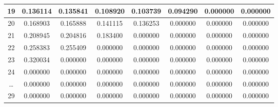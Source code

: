 \documentclass{article}
\begin{document}
\begin{table}[h!]
\begin{tabular}{|c|c|c|c|c|c|c|c|}
\hline
19&0.136114&0.135841&0.108920&0.103739&0.094290&0.000000&0.000000 \\ 
\hline
20&0.168903&0.165888&0.141115&0.136253&0.000000&0.000000&0.000000 \\ 
\hline
21&0.208945&0.204816&0.183400&0.000000&0.000000&0.000000&0.000000 \\ 
\hline
22&0.258383&0.255409&0.000000&0.000000&0.000000&0.000000&0.000000 \\ 
\hline
23&0.320034&0.000000&0.000000&0.000000&0.000000&0.000000&0.000000 \\ 
\hline
24&0.000000&0.000000&0.000000&0.000000&0.000000&0.000000&0.000000 \\ 
\hline
\dots&0.000000&0.000000&0.000000&0.000000&0.000000&0.000000&0.000000 \\
\hline
29&0.000000&0.000000&0.000000&0.000000&0.000000&0.000000&0.000000 \\ 
\hline
\end{tabular}
\end{table}
\end{document}

